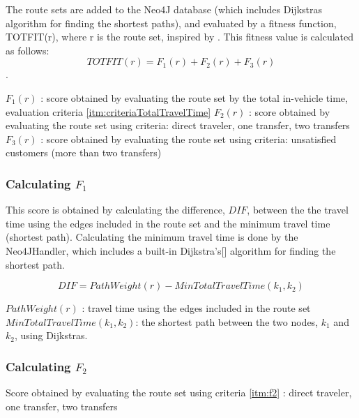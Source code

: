 The route sets are added to the Neo4J database (which includes Dijkstras algorithm for finding the shortest paths), and evaluated by a fitness function, TOTFIT(r), where r is the route set, inspired by \citep{kechagiopoulos14}.
This fitness value is calculated as follows:
$$ TOTFIT(r) = F_{1}(r) + F_{2}(r) + F_{3}(r)$$. 

$ F_{1}(r)$ : score obtained by evaluating the route set by the total in-vehicle time, evaluation criteria \ref{itm:criteriaTotalTravelTime}
\newline
$ F_{2}(r)$ : score obtained by evaluating the route set using criteria: direct traveler, one transfer, two transfers
\newline
$ F_{3}(r)$ : score obtained by evaluating the route set using criteria: unsatisfied customers (more than two transfers)
\newline

\subsubsection{Calculating $F_{1}$}

This score is obtained by calculating the difference, $DIF$, between the the travel time using the edges included in the route set and the minimum travel time (shortest path). Calculating the minimum travel time is done by the Neo4JHandler, which includes a built-in Dijkstra's[] algorithm for finding the shortest path. 

$$ DIF = PathWeight(r) - MinTotalTravelTime(k_{1},k_{2})$$

$ PathWeight(r)$ : travel time using the edges included in the route set
\newline
$ MinTotalTravelTime(k_{1},k_{2})$: the shortest path between the two nodes, $k_{1}$ and $k_{2}$, using Dijkstras.


\subsubsection{Calculating $F_{2}$}
Score obtained by evaluating the route set using criteria \ref{itm:f2} : direct traveler, one transfer, two transfers


